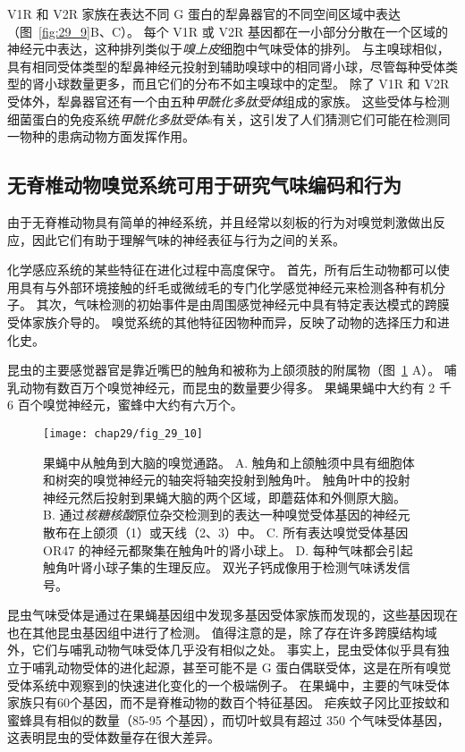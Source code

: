 V1R 和 V2R 家族在表达不同 G 蛋白的犁鼻器官的不同空间区域中表达（图~\ref{fig:29_9}B、C）。
每个 V1R 或 V2R 基因都在一小部分分散在一个区域的神经元中表达，这种排列类似于\textit{嗅上皮}细胞中气味受体的排列。
与主嗅球相似，具有相同受体类型的犁鼻神经元投射到辅助嗅球中的相同肾小球，尽管每种受体类型的肾小球数量更多，而且它们的分布不如主嗅球中的定型。
除了 V1R 和 V2R 受体外，犁鼻器官还有一个由五种\textit{甲酰化多肽受体}组成的家族。
这些受体与检测细菌蛋白的免疫系统\textit{甲酰化多肽受体}s有关，这引发了人们猜测它们可能在检测同一物种的患病动物方面发挥作用。



\subsection{无脊椎动物嗅觉系统可用于研究气味编码和行为}

由于无脊椎动物具有简单的神经系统，并且经常以刻板的行为对嗅觉刺激做出反应，因此它们有助于理解气味的神经表征与行为之间的关系。


化学感应系统的某些特征在进化过程中高度保守。
首先，所有后生动物都可以使用具有与外部环境接触的纤毛或微绒毛的专门化学感觉神经元来检测各种有机分子。 
其次，气味检测的初始事件是由周围感觉神经元中具有特定表达模式的跨膜受体家族介导的。
嗅觉系统的其他特征因物种而异，反映了动物的选择压力和进化史。


昆虫的主要感觉器官是靠近嘴巴的触角和被称为上颌须肢的附属物（图~\ref{fig:29_10} A）。
哺乳动物有数百万个嗅觉神经元，而昆虫的数量要少得多。
果蝇果蝇中大约有 2 千 6 百个嗅觉神经元，蜜蜂中大约有六万个。


\begin{figure}[htbp]
	\centering
	\texttt{[image: chap29/fig\_29\_10]}
	\caption{果蝇中从触角到大脑的嗅觉通路。
		A. 触角和上颌触须中具有细胞体和树突的嗅觉神经元的轴突将轴突投射到触角叶。
		触角叶中的投射神经元然后投射到果蝇大脑的两个区域，即蘑菇体和外侧原大脑。
		B. 通过\textit{核糖核酸}原位杂交检测到的表达一种嗅觉受体基因的神经元散布在上颌须（1）或天线（2、3）中。
		C. 所有表达嗅觉受体基因 OR47 的神经元都聚集在触角叶的肾小球上。
		D. 每种气味都会引起触角叶肾小球子集的生理反应。
		双光子钙成像用于检测气味诱发信号。}
	\label{fig:29_10}
\end{figure}


昆虫气味受体是通过在果蝇基因组中发现多基因受体家族而发现的，这些基因现在也在其他昆虫基因组中进行了检测。
值得注意的是，除了存在许多跨膜结构域外，它们与哺乳动物气味受体几乎没有相似之处。
事实上，昆虫受体似乎具有独立于哺乳动物受体的进化起源，甚至可能不是 G 蛋白偶联受体，这是在所有嗅觉受体系统中观察到的快速进化变化的一个极端例子。
在果蝇中，主要的气味受体家族只有60个基因，而不是脊椎动物的数百个特征基因。
疟疾蚊子冈比亚按蚊和蜜蜂具有相似的数量（85-95 个基因），而切叶蚁具有超过 350 个气味受体基因，这表明昆虫的受体数量存在很大差异。


